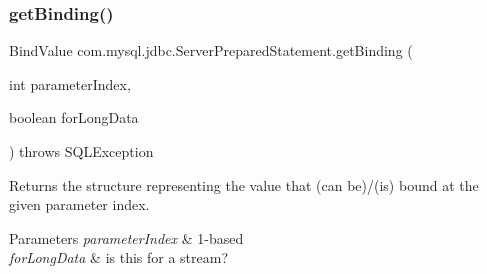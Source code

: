 \subsubsection{\texorpdfstring{get\+Binding()}{getBinding()}}
{\footnotesize\ttfamily Bind\+Value com.\+mysql.\+jdbc.\+Server\+Prepared\+Statement.\+get\+Binding (\begin{DoxyParamCaption}\item[{int}]{parameter\+Index,  }\item[{boolean}]{for\+Long\+Data }\end{DoxyParamCaption}) throws S\+Q\+L\+Exception\hspace{0.3cm}{\ttfamily [protected]}}

Returns the structure representing the value that (can be)/(is) bound at the given parameter index.


\begin{DoxyParams}{Parameters}
{\em parameter\+Index} & 1-\/based \\
\hline
{\em for\+Long\+Data} & is this for a stream? \\
\hline
\end{DoxyParams}

